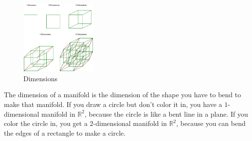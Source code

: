 \documentclass[11pt]{article}
\newcommand{\R}{\mathbb{R}} %
\begin{document}
\begin{figure}[h]
\begin{center}
\includegraphics[width=0.34\textwidth]{dimension.eps}
\end{center}
\vspace{-0.2in}
\caption{Dimensions}
\label{fig:4}
\end{figure}
\vspace{-0.2in}

The dimension of a manifold is the dimension of the shape you have to
bend to make that manifold. If you draw a circle but don't color it in, you
have a $1$-dimensional manifold in $\R^2$, because the circle is like a bent
line in a plane. If you color the circle in, you get a $2$-dimensional
manifold in $\R^2$, because you can bend the edges of a rectangle to make a
circle.
\end{document}
